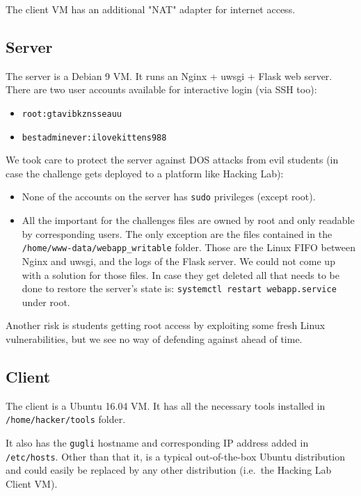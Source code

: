 \documentclass[11pt, a4paper]{article}
\begin{document}
  The client VM  has an additional "NAT" adapter for internet access.
  
\subsection{Server}
  The server is a Debian 9 VM. It runs an Nginx + uwsgi + Flask web server.
  There are two user accounts available for interactive login (via SSH too):
  \begin{itemize}
    \item \texttt{root:gtavibkznsseauu}
    \item \texttt{bestadminever:ilovekittens988}
  \end{itemize}

  We took care to protect the server against DOS attacks from evil students (in
  case the challenge gets deployed to a platform like Hacking Lab):
  \begin{itemize}
    \item None of the accounts on the server has \texttt{sudo} privileges (except root).
    \item All the important for the challenges files are owned by root and only
      readable by corresponding users. The only exception are the files contained
      in the \texttt{/home/www-data/webapp\_writable} folder. Those are the
      Linux FIFO between Nginx and uwsgi, and the logs of the Flask server. We could
      not come up with a solution for those files. In case they get deleted
      all that needs to be done to restore the server's state is:
      \texttt{systemctl restart webapp.service} under root.
  \end{itemize}

  Another risk is students getting root access by exploiting some fresh Linux
  vulnerabilities, but we see no way of defending against ahead of time.

\subsection{Client}
  The client is a Ubuntu 16.04 VM. It has all the necessary tools installed in
  \texttt{/home/hacker/tools} folder.

  It also has the \texttt{gugli} hostname and corresponding IP address added in \texttt{/etc/hosts}. Other than
  that it, is a typical out-of-the-box Ubuntu distribution and could easily be replaced
  by any other distribution (i.e.~the Hacking Lab Client VM).
\end{document}
